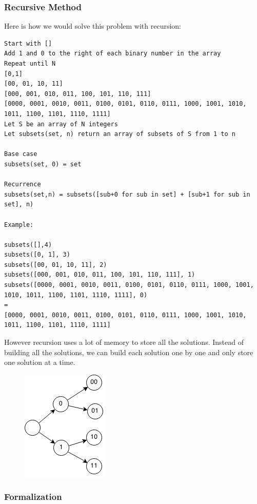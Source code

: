 \documentclass[11pt,oneside]{book}
\makeatletter
\def\maxwidth#1{\ifdim\Gin@nat@width>#1 #1\else\Gin@nat@width\fi}
\makeatother
\begin{document}
\subsubsection{Recursive Method}

Here is how we would solve this problem with recursion:

\begin{lstlisting}
Start with []
Add 1 and 0 to the right of each binary number in the array
Repeat until N
[0,1]
[00, 01, 10, 11]
[000, 001, 010, 011, 100, 101, 110, 111]
[0000, 0001, 0010, 0011, 0100, 0101, 0110, 0111, 1000, 1001, 1010, 1011, 1100, 1101, 1110, 1111]
Let S be an array of N integers
Let subsets(set, n) return an array of subsets of S from 1 to n
 
Base case
subsets(set, 0) = set
 
Recurrence
subsets(set,n) = subsets([sub+0 for sub in set] + [sub+1 for sub in set], n)

Example:

subsets([],4)
subsets([0, 1], 3)
subsets([00, 01, 10, 11], 2)
subsets([000, 001, 010, 011, 100, 101, 110, 111], 1)
subsets([0000, 0001, 0010, 0011, 0100, 0101, 0110, 0111, 1000, 1001, 1010, 1011, 1100, 1101, 1110, 1111], 0)
=
[0000, 0001, 0010, 0011, 0100, 0101, 0110, 0111, 1000, 1001, 1010, 1011, 1100, 1101, 1110, 1111]
\end{lstlisting}

However recursion uses a lot of memory to store all the solutions. Instead of building all the solutions, we can build each solution one by one and only store one solution at a time.

\vspace{5px}\begin{figure}[H]\centering
        \includegraphics[width=0.66\maxwidth{\textwidth}]{enumerate-sets.png}
        \end{figure}

\subsubsection{Formalization}
\end{document}
